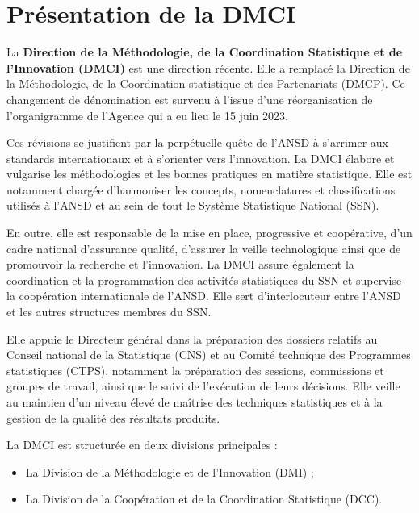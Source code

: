 \section{Présentation de la DMCI}

La \textbf{Direction de la Méthodologie, de la Coordination Statistique et de l’Innovation (DMCI)} 
est une direction récente. Elle a remplacé la Direction de la Méthodologie, de la Coordination 
statistique et des Partenariats (DMCP). Ce changement de dénomination est survenu à l’issue 
d’une réorganisation de l’organigramme de l’Agence qui a eu lieu le 15 juin 2023. 

Ces révisions se justifient par la perpétuelle quête de l’ANSD à s’arrimer aux standards 
internationaux et à s’orienter vers l’innovation. La DMCI élabore et vulgarise les méthodologies 
et les bonnes pratiques en matière statistique. Elle est notamment chargée d’harmoniser les 
concepts, nomenclatures et classifications utilisés à l’ANSD et au sein de tout le Système 
Statistique National (SSN). 

En outre, elle est responsable de la mise en place, progressive et coopérative, d’un cadre 
national d’assurance qualité, d’assurer la veille technologique ainsi que de promouvoir la 
recherche et l’innovation. La DMCI assure également la coordination et la programmation 
des activités statistiques du SSN et supervise la coopération internationale de l’ANSD. 
Elle sert d’interlocuteur entre l’ANSD et les autres structures membres du SSN. 

Elle appuie le Directeur général dans la préparation des dossiers relatifs au Conseil national 
de la Statistique (CNS) et au Comité technique des Programmes statistiques (CTPS), notamment 
la préparation des sessions, commissions et groupes de travail, ainsi que le suivi de l’exécution 
de leurs décisions. Elle veille au maintien d’un niveau élevé de maîtrise des techniques 
statistiques et à la gestion de la qualité des résultats produits. 


\begin{simplebox1}
La DMCI est structurée en deux divisions principales :  
\begin{itemize}
    \item La Division de la Méthodologie et de l’Innovation (DMI) ;
    \item La Division de la Coopération et de la Coordination Statistique (DCC).
\end{itemize}
\end{simplebox1}

